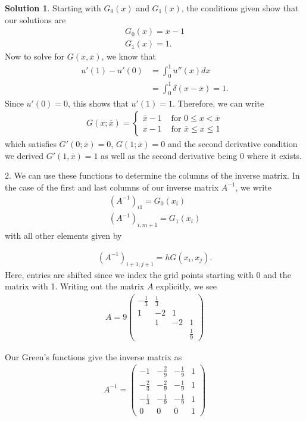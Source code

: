 \documentclass[12pt]{article}
\theoremstyle{definition}
\newtheorem{sol}{Solution}
\theoremstyle{remark}
\begin{document}
\begin{sol}
    Starting with $G_{0}(x)$ and $G_{1}(x)$, the conditions given show that our solutions are
    \begin{align*}
        G_{0}(x) = x - 1\\
        G_{1}(x) = 1.
    \end{align*}
    Now to solve for $G(x, \overline{x})$, we know that 
    \begin{align*}
        u'(1) - u'(0) &= \int_{0}^{1} u''(x) dx \\
                      &= \int_{0}^{1} \delta(x - \overline{x}) = 1. 
    \end{align*}
    Since $u'(0) = 0$, this shows that $u'(1) = 1$. Therefore, we can write 
    \begin{align*}
        G(x; \overline{x}) = 
        \begin{cases}
            \overline{x} - 1 &\text{ for } 0 \leq x < \overline{x}\\
            x - 1 &\text{ for } \overline{x} \leq x \leq 1 
        \end{cases}
    \end{align*}
    which satisfies $G'(0; \overline{x}) = 0$, $G(1; \overline{x}) = 0$ and the second derivative condition we derived $G'(1, \overline{x}) = 1$ as well as the second derivative being 0 where it exists.


    2. We can use these functions to determine the columns of the inverse matrix. In the case of the first and last columns of our inverse matrix $A^{-1}$, we write
\begin{align*}
    (A^{-1})_{i1} = G_{0}(x_{i}) \\
    (A^{-1})_{i,m+1} = G_{1}(x_{i}) 
\end{align*}
with all other elements given by 

\begin{align*}
    (A^{-1})_{i+1,j+1} = h G(x_{i}, x_{j}).
\end{align*}
Here, entries are shifted since we index the grid points starting with 0 and the matrix with 1. Writing out the matrix $A$ explicitly, we see
\begin{align*}
A = 9
\begin{pmatrix}
    -\frac{1}{3} & \frac{1}{3} & & \\
    1 & - 2 & 1 & \\
      & 1 & -2 & 1\\
      &   &    & \frac{1}{9}
\end{pmatrix}
\end{align*}

Our Green's functions give the inverse matrix as
\begin{align*}
    A^{-1} = \begin{pmatrix}
    -1 & -\frac{2}{9} & - \frac{1}{9} & 1\\
    -\frac{2}{3} & -\frac{2}{9} & -\frac{1}{9} & 1\\
    -\frac{1}{3} & -\frac{1}{9} & - \frac{1}{9} & 1\\
    0 & 0 & 0 & 1
\end{pmatrix}
\end{align*}
\end{sol}
\end{document}
